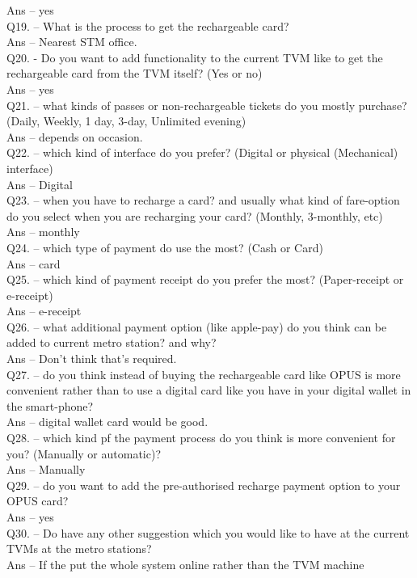 \documentclass[a4paper, 11pt]{report}
\begin{document}
Ans – yes\\
Q19. – What is the process to get the rechargeable card? \\
Ans – Nearest STM office. \\
Q20. -  Do you want to add functionality to the current TVM like to get the rechargeable card from the TVM itself? (Yes or no) \\
Ans – yes\\
Q21. – what kinds of passes or non-rechargeable tickets do you mostly purchase? (Daily, Weekly, 1 day, 3-day, Unlimited evening) \\
Ans – depends on occasion. \\
Q22. – which kind of interface do you prefer? (Digital or physical (Mechanical) interface) \\
Ans – Digital\\
Q23. – when you have to recharge a card? and usually what kind of fare-option do you select when you are recharging your card? (Monthly, 3-monthly, etc) \\
Ans – monthly\\
Q24. – which type of payment do use the most? (Cash or Card) \\
Ans – card\\
Q25. – which kind of payment receipt do you prefer the most? (Paper-receipt or e-receipt) \\
Ans – e-receipt\\
Q26. – what additional payment option (like apple-pay) do you think can be added to current metro station? and why? \\
Ans – Don’t think that’s required. \\
Q27. – do you think instead of buying the rechargeable card like OPUS is more convenient rather than to use a digital card like you have in your digital wallet in the smart-phone? \\
Ans – digital wallet card would be good. \\
Q28. – which kind pf the payment process do you think is more convenient for you? (Manually or automatic)? \\
Ans – Manually\\
Q29. – do you want to add the pre-authorised recharge payment option to your OPUS card? \\
Ans – yes\\
Q30. – Do have any other suggestion which you would like to have at the current TVMs at the metro stations? \\
Ans – If the put the whole system online rather than the TVM machine\\
\end{document}
